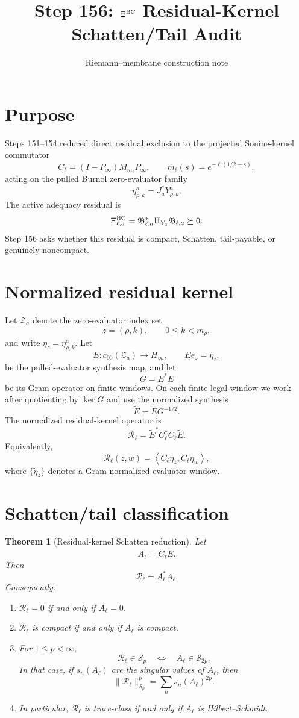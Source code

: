 \documentclass[11pt]{article}
\title{Step 156: $\Xi^{\rm BC}$ Residual-Kernel Schatten/Tail Audit}
\author{Riemann--membrane construction note}
\date{}
\newtheorem{theorem}{Theorem}
\begin{document}
\maketitle

\section{Purpose}
Steps 151--154 reduced direct residual exclusion to the projected Sonine-kernel commutator
\[
        C_\ell=(I-P_\infty)M_{m_\ell}P_\infty,
        \qquad
        m_\ell(s)=e^{-\ell(1/2-s)},
\]
acting on the pulled Burnol zero-evaluator family
\[
        \eta^a_{\rho,k}=J_a^*Y^a_{\rho,k}.
\]
The active adequacy residual is
\[
        \Xi^{\rm BC}_{\ell,a}
        =\mathfrak B_{\ell,a}^{*}\Pi_{Y_a}\mathfrak B_{\ell,a}\succeq0.
\]
Step 156 asks whether this residual is compact, Schatten, tail-payable, or genuinely noncompact.

\section{Normalized residual kernel}
Let $\mathcal Z_a$ denote the zero-evaluator index set
\[
        z=(\rho,k),\qquad 0\le k<m_\rho,
\]
and write $\eta_z=\eta^a_{\rho,k}$.  Let
\[
        E:c_{00}(\mathcal Z_a)\to H_\infty,
        \qquad E e_z=\eta_z,
\]
be the pulled-evaluator synthesis map, and let
\[
        G=E^*E
\]
be its Gram operator on finite windows.  On each finite legal window we work after quotienting by
$\ker G$ and use the normalized synthesis
\[
        \widetilde E=E G^{-1/2}.
\]
The normalized residual-kernel operator is
\[
        \boxed{
        \mathcal R_\ell
        =\widetilde E^*C_\ell^*C_\ell\widetilde E.
        }
\]
Equivalently,
\[
        \mathcal R_\ell(z,w)
        =\left\langle C_\ell\widetilde\eta_z,
        C_\ell\widetilde\eta_w\right\rangle,
\]
where $\{\widetilde\eta_z\}$ denotes a Gram-normalized evaluator window.

\section{Schatten/tail classification}
\begin{theorem}[Residual-kernel Schatten reduction]
Let
\[
        A_\ell=C_\ell\widetilde E.
\]
Then
\[
        \mathcal R_\ell=A_\ell^*A_\ell.
\]
Consequently:
\begin{enumerate}[label=(\roman*)]
\item $\mathcal R_\ell=0$ if and only if $A_\ell=0$.
\item $\mathcal R_\ell$ is compact if and only if $A_\ell$ is compact.
\item For $1\le p<\infty$,
\[
        \mathcal R_\ell\in\mathcal S_p
        \quad\Longleftrightarrow\quad
        A_\ell\in\mathcal S_{2p}.
\]
In that case, if $s_n(A_\ell)$ are the singular values of $A_\ell$, then
\[
        \|\mathcal R_\ell\|_{\mathcal S_p}^p
        =\sum_n s_n(A_\ell)^{2p}.
\]
\item In particular, $\mathcal R_\ell$ is trace-class if and only if $A_\ell$ is Hilbert--Schmidt.
\end{enumerate}
\end{theorem}
\end{document}
